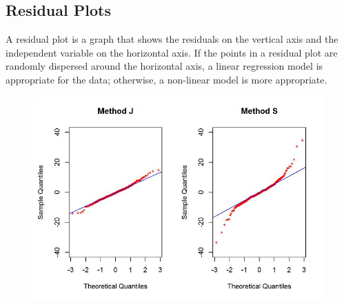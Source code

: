 \documentclass[12pt, a4paper]{report}
\theoremstyle{plain}
\theoremstyle{definition}
\theoremstyle{remark}
\begin{document}
		

		\subsection{Residual Plots}
		A residual plot is a graph that shows the residuals on the vertical axis and the independent variable on the horizontal axis. If the points in a residual plot are randomly dispersed around the horizontal axis, a linear regression model is appropriate for the data; otherwise, a non-linear model is more appropriate.
		
		
		
		\begin{figure}[h!]
			\centering
			\includegraphics[width=1.1\linewidth]{images/Resid-newplot2}
			\caption{}
			\label{fig:Resid-newplot2}
		\end{figure}
		
\end{document}
